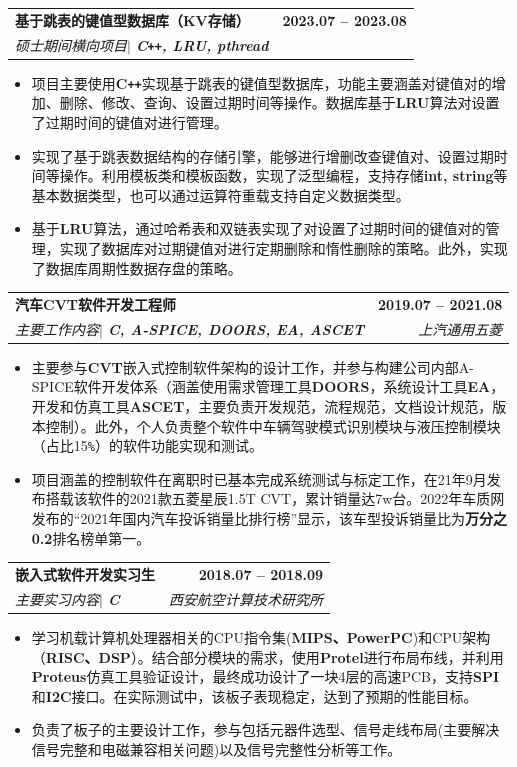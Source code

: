 \documentclass[letterpaper,11pt]{article}
\makeatletter
\newcommand{\resumeItem}[1]{	
	\item\small{
		{#1 \vspace{-2pt}}
	}
}
\newcommand{\resumeSubheading}[4]{
	\vspace{-2pt}\item
	\begin{tabular*}{1.0\textwidth}[t]{l@{\extracolsep{\fill}}r}
		\textbf{\CJKfamily{STSong}#1} & \textbf{\small #2} \\
		\textit{\small\CJKfamily{KaiTi}#3} & \textit{\small #4} \\
	\end{tabular*}\vspace{-7pt}
	
}
\newcommand{\resumeItemListStart}{\begin{itemize}}
\newcommand{\resumeItemListEnd}{\end{itemize}\vspace{-5pt}}
\makeatother
\begin{document}
		\resumeSubheading
		{基于跳表的键值型数据库（KV存储）}{2023.07 -- 2023.08}
		{硕士期间横向项目$|$ \emph{\textbf{C\texttt{++}, LRU, pthread}}}{ }
		
		\resumeItemListStart
		\resumeItem{项目主要使用\textbf{C\texttt{++}}实现基于跳表的键值型数据库，功能主要涵盖对键值对的增加、删除、修改、查询、设置过期时间等操作。数据库基于\textbf{LRU}算法对设置了过期时间的键值对进行管理。}
		\resumeItem{实现了基于跳表数据结构的存储引擎，能够进行增删改查键值对、设置过期时间等操作。利用模板类和模板函数，实现了泛型编程，支持存储\textbf{int, string}等基本数据类型，也可以通过运算符重载支持自定义数据类型。}
		\resumeItem{基于\textbf{LRU}算法，通过哈希表和双链表实现了对设置了过期时间的键值对的管理，实现了数据库对过期键值对进行定期删除和惰性删除的策略。此外，实现了数据库周期性数据存盘的策略。}
		\resumeItemListEnd
	
		
		\resumeSubheading
		{汽车CVT软件开发工程师}{2019.07 -- 2021.08}
		{主要工作内容$|$ \emph{\textbf{C, A-SPICE, DOORS, EA, ASCET}}}{上汽通用五菱}
		
		\resumeItemListStart
		\resumeItem{主要参与\textbf{CVT}嵌入式控制软件架构的设计工作，并参与构建公司内部A-SPICE软件开发体系（涵盖使用需求管理工具\textbf{DOORS}，系统设计工具\textbf{EA}，开发和仿真工具\textbf{ASCET}，主要负责开发规范，流程规范，文档设计规范，版本控制）。此外，个人负责整个软件中车辆驾驶模式识别模块与液压控制模块（占比15\texttt{\%}）的软件功能实现和测试。}
		\resumeItem{项目涵盖的控制软件在离职时已基本完成系统测试与标定工作，在21年9月发布搭载该软件的2021款五菱星辰1.5T CVT，累计销量达7w台。2022年车质网发布的“2021年国内汽车投诉销量比排行榜”显示，该车型投诉销量比为\textbf{万分之0.2}排名榜单第一。}
		\resumeItemListEnd
	
		\resumeSubheading	
		{嵌入式软件开发实习生}{2018.07 -- 2018.09}
		{主要实习内容$|$ \emph{\textbf{C}}}{西安航空计算技术研究所}
		
		\resumeItemListStart
		\resumeItem{学习机载计算机处理器相关的CPU指令集(\textbf{MIPS、PowerPC})和CPU架构（\textbf{RISC、DSP}）。结合部分模块的需求，使用\textbf{Protel}进行布局布线，并利用\textbf{Proteus}仿真工具验证设计，最终成功设计了一块4层的高速PCB，支持\textbf{SPI}和\textbf{I2C}接口。在实际测试中，该板子表现稳定，达到了预期的性能目标。}
		\resumeItem{负责了板子的主要设计工作，参与包括元器件选型、信号走线布局(主要解决信号完整和电磁兼容相关问题)以及信号完整性分析等工作。}
		\resumeItemListEnd
		
\end{document}

